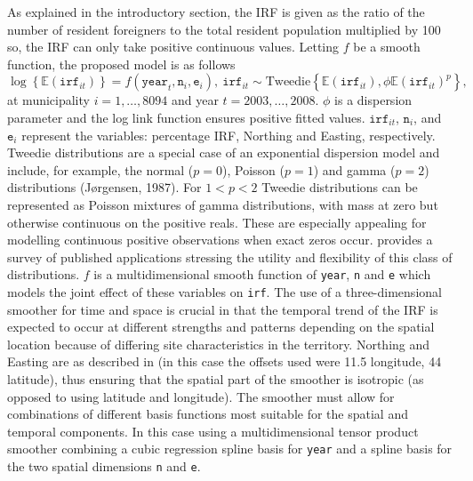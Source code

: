 As explained in the introductory section, the IRF is given as the ratio of the number of resident foreigners to the total resident population multiplied by 100 so, the IRF can only take positive continuous values. Letting $f$ be a smooth function, the proposed model is as follows
\begin{equation}
\log \left\{\mathbb{E}(\texttt{irf}_{it})\right\} = f(\texttt{year}_t,\texttt{n}_i,\texttt{e}_i), \ \texttt{irf}_{it} \sim \text{Tweedie}\left\{\mathbb{E}(\texttt{irf}_{it}),\phi \mathbb{E}(\texttt{irf}_{it})^{p}\right\},          
\label{PropM}
\end{equation}
at municipality $i=1,\ldots,8094$ and year $t=2003,\ldots,2008$. $\phi$ is a dispersion parameter and the log link function ensures positive fitted values. $\texttt{irf}_{it}$, $\texttt{n}_i$, and $\texttt{e}_i$ represent the variables: percentage IRF, Northing and Easting, respectively. Tweedie distributions are a special case of an exponential dispersion model and include, for example, the normal ($p=0$), Poisson ($p=1$) and gamma ($p=2$) distributions (J\o rgensen, 1987). For $1<p<2$ Tweedie distributions can be represented as Poisson mixtures of gamma distributions, with mass at zero but otherwise continuous on the positive reals. These are especially appealing for modelling continuous positive observations when exact zeros occur.  provides a survey of published applications stressing the utility and flexibility of this class of distributions. $f$ is a multidimensional smooth function of \texttt{year}, \texttt{n} and \texttt{e} which models the joint effect of these variables on \texttt{irf}. The use of a three-dimensional smoother for time and space is crucial in that the temporal trend of the IRF is expected to occur at different strengths and patterns depending on the spatial location because of differing site characteristics in the territory. Northing and Easting are as described in  (in this case the offsets used were 11.5 longitude, 44 latitude), thus ensuring that the spatial part of the smoother is isotropic (as opposed to using latitude and longitude). The smoother must allow for combinations of different basis functions most suitable for the spatial and temporal components. In this case using a multidimensional tensor product smoother combining a cubic regression spline basis for \texttt{year} and a spline basis for the two spatial dimensions \texttt{n} and \texttt{e}. 

